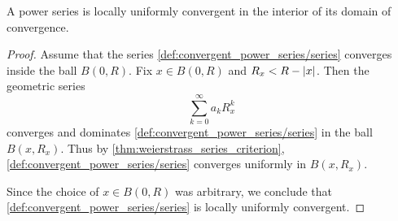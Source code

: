 \begin{proposition}\label{thm:power_series_are_locally_uniform_convergent}
  A power series is locally uniformly convergent in the interior of its domain of convergence.
\end{proposition}
\begin{proof}
  Assume that the series \cref{def:convergent_power_series/series} converges inside the ball \( B(0, R) \). Fix \( x \in B(0, R) \) and \( R_x < R - \left\vert x \right\vert \). Then the geometric series
  \begin{equation*}
    \sum_{k=0}^\infty a_k R_x^k
  \end{equation*}
  converges and dominates \cref{def:convergent_power_series/series} in the ball \( B(x, R_x) \). Thus by \cref{thm:weierstrass_series_criterion}, \cref{def:convergent_power_series/series} converges uniformly in \( B(x, R_x) \).

  Since the choice of \( x \in B(0, R) \) was arbitrary, we conclude that \cref{def:convergent_power_series/series} is locally uniformly convergent.
\end{proof}

